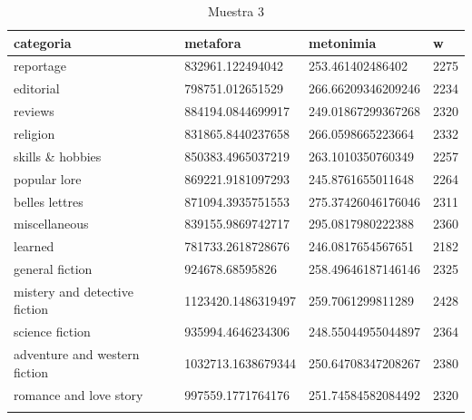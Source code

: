 \documentclass[twoside]{article}
\begin{document}
\begin{center}
        \begin{longtable}{| p{} | p{} | p{}|p{}|}
\caption{Muestra 3}
    \hline
          categoria & metafora & metonimia & w \\ \hline
        reportage & 832961.122494042 & 253.461402486402 & 2275 \\ \hline
        editorial & 798751.012651529 & 266.66209346209246 & 2234 \\ \hline
        reviews & 884194.0844699917 & 249.01867299367268 & 2320 \\ \hline
        religion & 831865.8440237658 & 266.0598665223664 & 2332 \\ \hline
        skills \& hobbies & 850383.4965037219 & 263.1010350760349 & 2257 \\ \hline
        popular lore & 869221.9181097293 & 245.8761655011648 & 2264 \\ \hline
        belles lettres & 871094.3935751553 & 275.37426046176046 & 2311 \\ \hline
        miscellaneous & 839155.9869742717 & 295.0817980222388 & 2360 \\ \hline
        learned & 781733.2618728676 & 246.0817654567651 & 2182 \\ \hline
        general fiction & 924678.68595826 & 258.49646187146146 & 2325 \\ \hline
        mistery and detective fiction & 1123420.1486319497 & 259.7061299811289 & 2428 \\ \hline
        science fiction & 935994.4646234306 & 248.55044955044897 & 2364 \\ \hline
        adventure and western fiction & 1032713.1638679344 & 250.64708347208267 & 2380 \\ \hline
        romance and love story & 997559.1771764176 & 251.74584582084492 & 2320 \\ \hline
    \label{muestra3}
\end{longtable}
\end{center}
\end{document}
